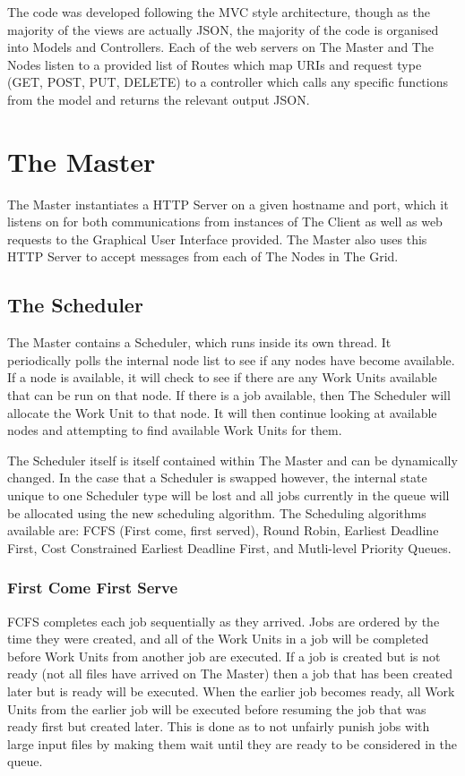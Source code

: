 The code was developed following the MVC style architecture, though as the majority of the views are actually JSON, the majority of the code is organised into Models and Controllers. Each of the web servers on The Master and The Nodes listen to a provided list of Routes which map URIs and request type (GET, POST, PUT, DELETE) to a controller which calls any specific functions from the model and returns the relevant output JSON.

\section{The Master}

The Master instantiates a HTTP Server on a given hostname and port, which it listens on for both communications from instances of The Client as well as web requests to the Graphical User Interface provided. The Master also uses this HTTP Server to accept messages from each of The Nodes in The Grid.  

\subsection{The Scheduler}

The Master contains a Scheduler, which runs inside its own thread. It periodically polls the internal node list to see if any nodes have become available. If a node is available, it will check to see if there are any Work Units available that can be run on that node. If there is a job available, then The Scheduler will allocate the Work Unit to that node. It will then continue looking at available nodes and attempting to find available Work Units for them. 

The Scheduler itself is itself contained within The Master and can be dynamically changed. In the case that a Scheduler is swapped however, the internal state unique to one Scheduler type will be lost and all jobs currently in the queue will be allocated using the new scheduling algorithm. The Scheduling algorithms available are: FCFS (First come, first served), Round Robin, Earliest Deadline First, Cost Constrained Earliest Deadline First, and Mutli-level Priority Queues. 


\subsubsection{First Come First Serve}
FCFS completes each job sequentially as they arrived. Jobs are ordered by the time they were created, and all of the Work Units in a job will be completed before Work Units from another job are executed. If a job is created but is not ready (not all files have arrived on The Master) then a job that has been created later but is ready will be executed. When the earlier job becomes ready, all Work Units from the earlier job will be executed before resuming the job that was ready first but created later. This is done as to not unfairly punish jobs with large input files by making them wait until they are ready to be considered in the queue.

